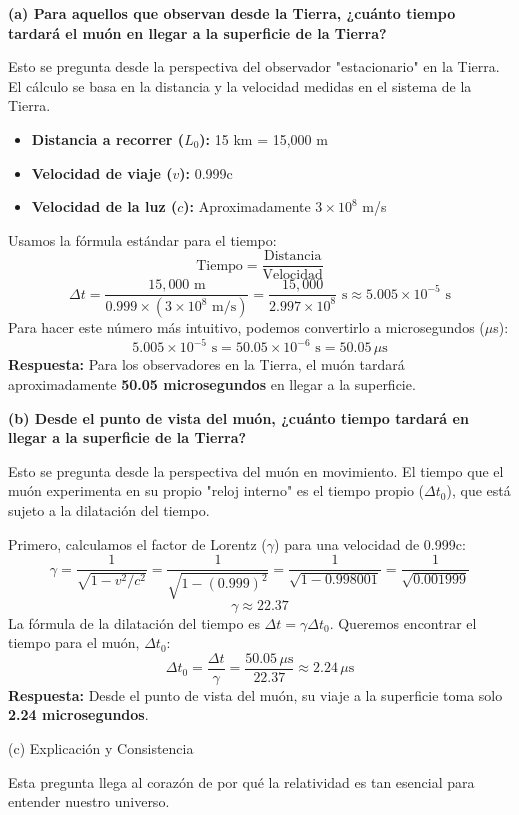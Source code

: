 \documentclass[11pt,a4paper]{article}
\begin{document}
\begin{enumerate}
\begin{itemize}
\textbf{(a) Para aquellos que observan desde la Tierra, ¿cuánto tiempo tardará el muón en llegar a la superficie de la Tierra?}

Esto se pregunta desde la perspectiva del observador "estacionario" en la Tierra. El cálculo se basa en la distancia y la velocidad medidas en el sistema de la Tierra.

\begin{itemize}
    \item \textbf{Distancia a recorrer ($L_0$):} 15 km = 15,000 m
    \item \textbf{Velocidad de viaje ($v$):} 0.999c
    \item \textbf{Velocidad de la luz ($c$):} Aproximadamente $3 \times 10^8$ m/s
\end{itemize}
Usamos la fórmula estándar para el tiempo:
\[ \text{Tiempo} = \frac{\text{Distancia}}{\text{Velocidad}} \]
\[ \Delta t = \frac{15,000 \text{ m}}{0.999 \times (3 \times 10^8 \text{ m/s})} = \frac{15,000}{2.997 \times 10^8} \text{ s} \approx 5.005 \times 10^{-5} \text{ s} \]
Para hacer este número más intuitivo, podemos convertirlo a microsegundos ($\mu$s):
\[ 5.005 \times 10^{-5} \text{ s} = 50.05 \times 10^{-6} \text{ s} = 50.05 \, \mu\text{s} \]
\textbf{Respuesta:} Para los observadores en la Tierra, el muón tardará aproximadamente \textbf{50.05 microsegundos} en llegar a la superficie.

\textbf{(b) Desde el punto de vista del muón, ¿cuánto tiempo tardará en llegar a la superficie de la Tierra?}

Esto se pregunta desde la perspectiva del muón en movimiento. El tiempo que el muón experimenta en su propio "reloj interno" es el tiempo propio ($\Delta t_0$), que está sujeto a la dilatación del tiempo.

Primero, calculamos el factor de Lorentz ($\gamma$) para una velocidad de 0.999c:
\[ \gamma = \frac{1}{\sqrt{1 - v^2/c^2}} = \frac{1}{\sqrt{1 - (0.999)^2}} = \frac{1}{\sqrt{1 - 0.998001}} = \frac{1}{\sqrt{0.001999}} \]
\[ \gamma \approx 22.37 \]
La fórmula de la dilatación del tiempo es $\Delta t = \gamma \Delta t_0$. Queremos encontrar el tiempo para el muón, $\Delta t_0$:
\[ \Delta t_0 = \frac{\Delta t}{\gamma} = \frac{50.05 \, \mu\text{s}}{22.37} \approx 2.24 \, \mu\text{s} \]
\textbf{Respuesta:} Desde el punto de vista del muón, su viaje a la superficie toma solo \textbf{2.24 microsegundos}.

\textbf{}{(c) Explicación y Consistencia}

Esta pregunta llega al corazón de por qué la relatividad es tan esencial para entender nuestro universo.


\end{itemize}
\end{enumerate}
\end{document}
